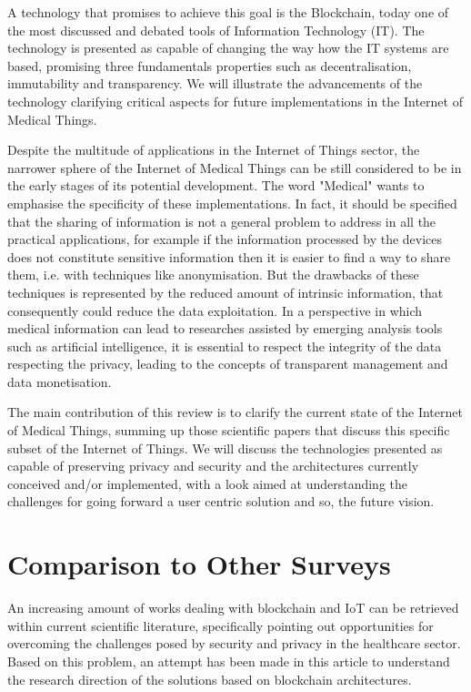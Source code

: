\documentclass[preprint]{elsarticle}
\begin{document}
A technology that promises to achieve this goal is the Blockchain, today one of the most discussed and debated tools of Information Technology (IT). 
The technology is presented as capable of changing the way how the IT systems are based, promising three fundamentals properties such as decentralisation, immutability and transparency. 
We will illustrate the advancements of the technology clarifying critical aspects for future implementations in the Internet of Medical Things.

Despite the multitude of applications in the Internet of Things sector, the narrower sphere of the Internet of Medical Things can be still considered to be in the early stages of its potential development. The word "Medical" wants to emphasise the specificity of these implementations. In fact, it should be specified that the sharing of information is not a general problem to address in all the practical applications, for example if the information processed by the devices does not constitute sensitive information then it is easier to find a way to share them, i.e. with techniques like anonymisation. But the drawbacks of these techniques is represented by the reduced amount of intrinsic information, that consequently could reduce the data exploitation.  
In a perspective in which medical information can lead to researches assisted by emerging analysis tools such as artificial intelligence, it is essential to respect the integrity of the data respecting the privacy, leading to the concepts of transparent management and data monetisation.

The main contribution of this review is to clarify the current state of the Internet of Medical Things, summing up those scientific papers that discuss this specific subset of the Internet of Things. We will discuss the technologies presented as capable of preserving privacy and security and the architectures currently conceived and/or implemented, with a look aimed at understanding the challenges for going forward a user centric solution and so, the future vision.

\section{Comparison to Other Surveys}

An increasing amount of works dealing with blockchain and IoT can be retrieved within current scientific literature, specifically pointing out opportunities for overcoming the challenges posed by security and privacy in the healthcare sector.
Based on this problem, an attempt has been made in this article to understand the research direction of the solutions based on blockchain architectures.
\end{document}
